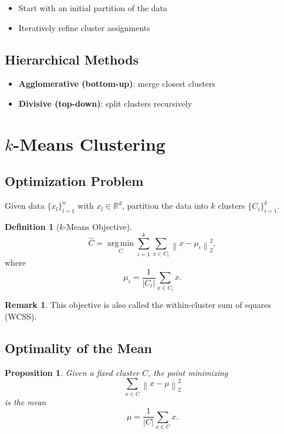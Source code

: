 \documentclass[12pt,oneside]{book}
\numberwithin{equation}{section}
\theoremstyle{definition}
\newtheorem{definition}{Definition}[section]
\newtheorem{remark}{Remark}[section]
\theoremstyle{plain}
\newtheorem{proposition}{Proposition}[section]
\theoremstyle{remark}
\newcommand{\R}{\mathbb{R}}
\newcommand{\argmin}{\operatorname*{arg\,min}}
\newcommand{\norm}[1]{\left\lVert #1 \right\rVert}
\begin{document}
\begin{itemize}
    \item Start with an initial partition of the data
    \item Iteratively refine cluster assignments
\end{itemize}

\subsection{Hierarchical Methods}

\begin{itemize}
    \item \textbf{Agglomerative (bottom-up)}: merge closest clusters
    \item \textbf{Divisive (top-down)}: split clusters recursively
\end{itemize}

\section{$k$-Means Clustering}

\subsection{Optimization Problem}

Given data $\{x_l\}_{l=1}^n$ with $x_l \in \R^d$, partition the data into $k$ clusters $\{C_i\}_{i=1}^k$.

\begin{definition}[$k$-Means Objective]
\[
\hat{C}
=
\argmin_{C}
\sum_{i=1}^k
\sum_{x \in C_i}
\norm{x-\mu_i}_2^2,
\]
where
\[
\mu_i
=
\frac{1}{|C_i|}
\sum_{x \in C_i} x.
\]
\end{definition}

\begin{remark}
This objective is also called the within-cluster sum of squares (WCSS).
\end{remark}

\subsection{Optimality of the Mean}

\begin{proposition}
Given a fixed cluster $C$, the point minimizing
\[
\sum_{x \in C} \norm{x - \mu}_2^2
\]
is the mean
\[
\mu = \frac{1}{|C|}\sum_{x \in C} x.
\]
\end{proposition}
\end{document}
